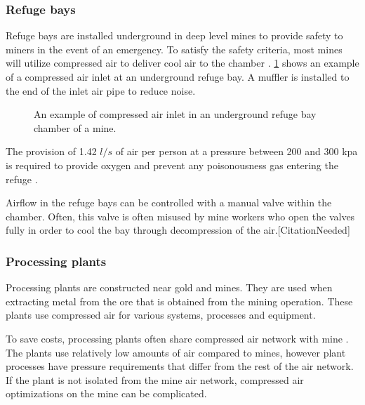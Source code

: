 			\subsubsection{Refuge bays}
				Refuge bays are installed underground in deep level mines to provide safety to miners in the event of an emergency. To satisfy the safety criteria, most mines will utilize compressed air to deliver cool air to the chamber \cite{brake1999criteria}. \cref{fig: Refuge Bay} shows an example of a compressed air inlet at an underground refuge bay. A muffler is installed to the end of the inlet air pipe to reduce noise.
				\begin{figure}[h]
					\centering
					\caption{An example of compressed air inlet in an underground refuge bay chamber of a mine.}
					\label{fig: Refuge Bay}
				\end{figure}
				\par The provision of 1.42 $l/s$ of air per person at a pressure between 200 and 300 \gls{kpa} is required to provide oxygen and prevent any poisonousness gas entering the refuge \cite{brake1999criteria}.\par
				Airflow in the refuge bays can be controlled with a manual valve within the chamber. Often, this valve is often misused by mine workers who open the valves fully in order to cool the bay through decompression of the air.[CitationNeeded]
			\subsubsection{Processing plants}
				Processing plants are constructed near gold and mines. They are used when extracting metal from the ore that is obtained from the mining operation. These plants use compressed air for various systems, processes and equipment. 
				\par 
				To save costs, processing plants often share compressed air network with mine \cite{Marais2012PhD}. The plants use relatively low amounts of air compared to mines, however plant processes have pressure requirements that differ from the rest of the air network. If the plant is not isolated from the mine air network, compressed air optimizations on the mine can be complicated. 

